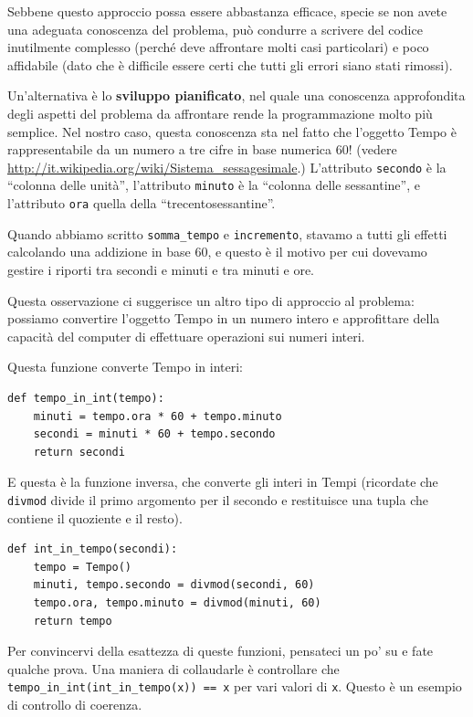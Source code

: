 \documentclass[10pt]{book}
\begin{document}
Sebbene questo approccio possa essere abbastanza efficace, specie se non avete una adeguata conoscenza del problema, può condurre a scrivere del codice inutilmente complesso (perché deve affrontare molti casi particolari) e poco affidabile (dato che è difficile essere certi che tutti gli errori siano stati rimossi).

Un'alternativa è lo {\bf sviluppo pianificato}, nel quale una conoscenza approfondita degli aspetti del problema da affrontare rende la programmazione molto più semplice. Nel nostro caso, questa conoscenza sta nel fatto che l'oggetto Tempo è rappresentabile da un numero a tre cifre in base numerica 60! (vedere \url{http://it.wikipedia.org/wiki/Sistema_sessagesimale}.)  L'attributo
{\tt secondo} è la ``colonna delle unità'', l'attributo {\tt minuto}
è la ``colonna delle sessantine'', e l'attributo {\tt ora} quella della ``trecentosessantine''.

Quando abbiamo scritto \verb"somma_tempo" e {\tt incremento}, stavamo a tutti gli effetti calcolando una addizione in base 60, e questo è il motivo per cui dovevamo gestire i riporti tra secondi e minuti e tra minuti e ore.

Questa osservazione ci suggerisce un altro tipo di approccio al problema: possiamo convertire l'oggetto Tempo in un numero intero e approfittare della capacità del computer di effettuare operazioni sui numeri interi.

Questa funzione converte Tempo in interi:

\begin{verbatim}
def tempo_in_int(tempo):
    minuti = tempo.ora * 60 + tempo.minuto
    secondi = minuti * 60 + tempo.secondo
    return secondi
\end{verbatim}
%
E questa è la funzione inversa, che converte gli interi in Tempi (ricordate che {\tt divmod} divide il primo argomento per il secondo e restituisce una tupla che contiene il quoziente e il resto).

\begin{verbatim}
def int_in_tempo(secondi):
    tempo = Tempo()
    minuti, tempo.secondo = divmod(secondi, 60)
    tempo.ora, tempo.minuto = divmod(minuti, 60)
    return tempo
\end{verbatim}
%
Per convincervi della esattezza di queste funzioni, pensateci un po' su e fate qualche prova. Una maniera di collaudarle è controllare che \verb"tempo_in_int(int_in_tempo(x)) == x" per vari valori di {\tt x}. Questo è un esempio di controllo di coerenza.
\end{document}
